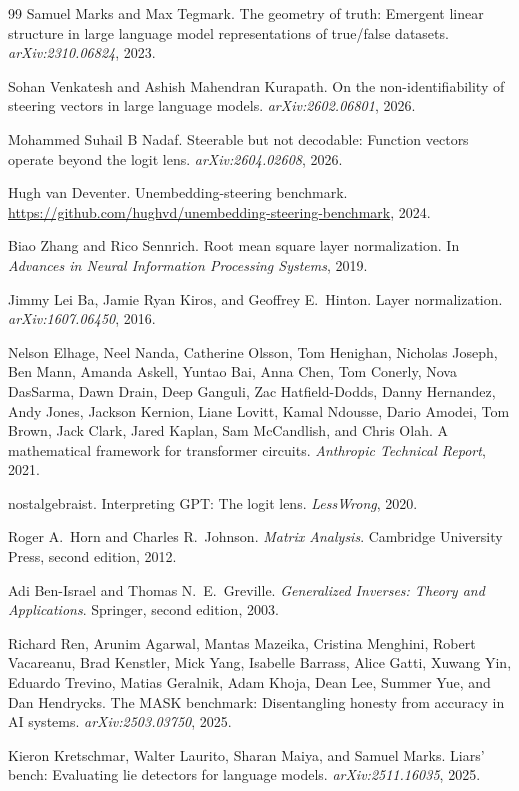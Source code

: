\documentclass[11pt,letterpaper]{article}
\theoremstyle{plain}
\theoremstyle{definition}
\newcommand{\1}{\mathbf{1}}
\begin{document}
\begin{thebibliography}{99}
Samuel Marks and Max Tegmark.
\newblock The geometry of truth: Emergent linear structure in large language model representations of true/false datasets.
\newblock \emph{arXiv:2310.06824}, 2023.

Sohan Venkatesh and Ashish Mahendran Kurapath.
\newblock On the non-identifiability of steering vectors in large language models.
\newblock \emph{arXiv:2602.06801}, 2026.

Mohammed Suhail B Nadaf.
\newblock Steerable but not decodable: Function vectors operate beyond the logit lens.
\newblock \emph{arXiv:2604.02608}, 2026.

Hugh van Deventer.
\newblock Unembedding-steering benchmark.
\newblock \url{https://github.com/hughvd/unembedding-steering-benchmark}, 2024.

Biao Zhang and Rico Sennrich.
\newblock Root mean square layer normalization.
\newblock In \emph{Advances in Neural Information Processing Systems}, 2019.

Jimmy Lei Ba, Jamie Ryan Kiros, and Geoffrey E.\ Hinton.
\newblock Layer normalization.
\newblock \emph{arXiv:1607.06450}, 2016.

Nelson Elhage, Neel Nanda, Catherine Olsson, Tom Henighan, Nicholas Joseph, Ben Mann, Amanda Askell, Yuntao Bai, Anna Chen, Tom Conerly, Nova DasSarma, Dawn Drain, Deep Ganguli, Zac Hatfield-Dodds, Danny Hernandez, Andy Jones, Jackson Kernion, Liane Lovitt, Kamal Ndousse, Dario Amodei, Tom Brown, Jack Clark, Jared Kaplan, Sam McCandlish, and Chris Olah.
\newblock A mathematical framework for transformer circuits.
\newblock \emph{Anthropic Technical Report}, 2021.

nostalgebraist.
\newblock Interpreting GPT: The logit lens.
\newblock \emph{LessWrong}, 2020.

Roger A.\ Horn and Charles R.\ Johnson.
\newblock \emph{Matrix Analysis}.
\newblock Cambridge University Press, second edition, 2012.

Adi Ben-Israel and Thomas N.\ E.\ Greville.
\newblock \emph{Generalized Inverses: Theory and Applications}.
\newblock Springer, second edition, 2003.

Richard Ren, Arunim Agarwal, Mantas Mazeika, Cristina Menghini, Robert Vacareanu, Brad Kenstler, Mick Yang, Isabelle Barrass, Alice Gatti, Xuwang Yin, Eduardo Trevino, Matias Geralnik, Adam Khoja, Dean Lee, Summer Yue, and Dan Hendrycks.
\newblock The MASK benchmark: Disentangling honesty from accuracy in AI systems.
\newblock \emph{arXiv:2503.03750}, 2025.

Kieron Kretschmar, Walter Laurito, Sharan Maiya, and Samuel Marks.
\newblock Liars' bench: Evaluating lie detectors for language models.
\newblock \emph{arXiv:2511.16035}, 2025.

\end{thebibliography}
\end{document}
